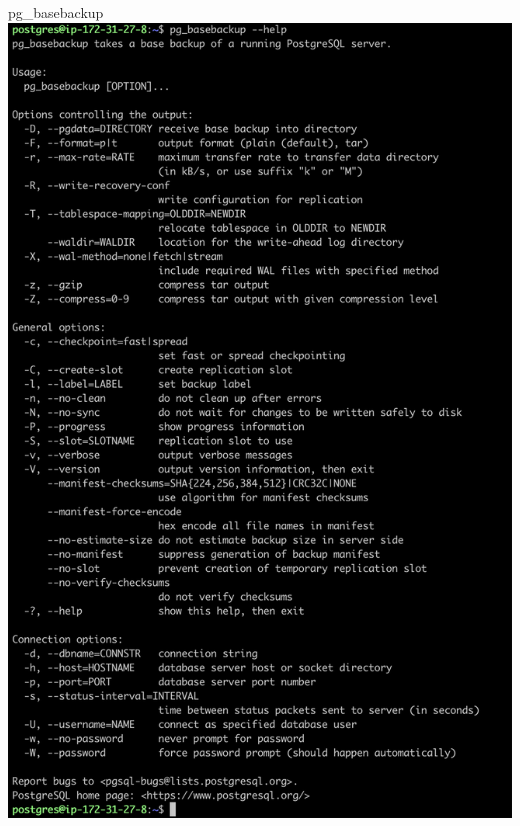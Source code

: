 \documentclass[aspectratio=169]{beamer}
\begin{document}
\begin{frame}{pg\_basebackup}
    \centering
    \includegraphics[width=\textwidth, trim={0cm 68cm 0cm 0cm}, clip]{figures/pg_basebackup}
\end{frame}
\end{document}
